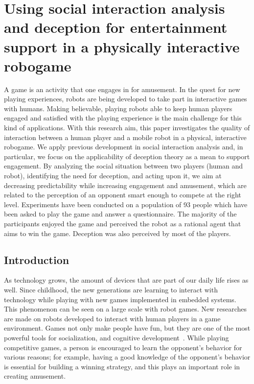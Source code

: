 \chapter{Using social interaction analysis and deception for entertainment support in a physically interactive robogame}

A game is an activity that one engages in for amusement. In the quest for new playing experiences, robots are being developed to take part in interactive games with humans. Making believable, playing robots able to keep human players engaged and satisfied with the playing experience is the main challenge for this kind of applications. 
With this research aim, this paper investigates the quality of interaction between a human player and a mobile robot in a physical, interactive robogame. We apply previous development in social interaction analysis and, in particular, we focus on the applicability of deception theory as a mean to support engagement. By analyzing the social situation between two players (human and robot), identifying the need for deception, and acting upon it, we aim at decreasing predictability while increasing engagement and amusement, which are related to the perception of an opponent smart enough to compete at the right level. Experiments have been conducted on a population of 93 people which have been asked to play the game and answer a questionnaire. The majority of the participants enjoyed the game and perceived the robot as a rational agent that aims to win the game. Deception was also perceived by most of the players.

\section{Introduction}

As technology grows, the amount of devices that are part of our daily life rises as well. Since childhood, the new generations are learning to interact with technology while playing with new games implemented in embedded systems. This phenomenon can be seen on a large scale with robot games. New researches are made on robots developed to interact with human players in a game environment. Games not only make people have fun, but they are one of the most powerful tools for socialization, and cognitive development~\cite{vygotsky1967play, bruner1976play, piaget2013play}.  While playing competitive games, a person is encouraged to learn the opponent's behavior for various reasons; for example, having a good knowledge of the opponent's behavior is essential for building a winning strategy, and this plays an important role in creating amusement.

